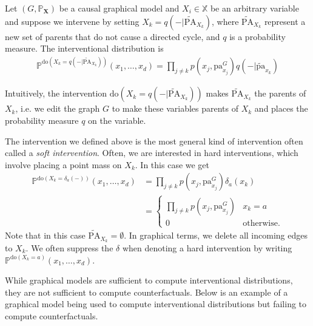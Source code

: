 \documentclass[../main.tex]{subfiles}
\begin{document}
    \begin{defn}
    \label{defn:Interventional-distributions}
        Let ${(G, \mathbb{P}_\mathbf{X})}$ be a causal graphical model and ${X_i\in \mathbb{X}}$ be an arbitrary variable and suppose we intervene by setting ${X_k = q(- | \tilde{\text{PA}}_{X_k})}$, where $\tilde{\text{PA}}_{X_k}$ represent a new set of parents that do not cause a directed cycle, and ${q}$ is a probability measure. The interventional distribution is 
        \begin{align*}
            \mathbb{P}^{\text{do}(X_k = q(- | \tilde{\text{PA}}_{X_k}))}(x_1,\dots, x_d) = \prod_{j\neq k} p(x_j, \text{pa}_{x_j}^G)q(- | \tilde{\text{pa}}_{x_k})
        \end{align*}
    \end{defn}
    Intuitively, the intervention ${\text{do}(X_k = q(- | \tilde{\text{PA}}_{X_k}))}$ makes ${\tilde{\text{PA}}_{X_k}}$ the parents of ${X_k}$, i.e. we edit the graph ${G}$ to make these variables parents of ${X_k}$ and places the probability measure ${q}$ on the variable.
    \begin{rem}
    \label{rem:Hard-Interventions}
        The intervention we defined above is the most general kind of intervention often called a \emph{soft intervention}. Often, we are interested in hard interventions, which involve placing a point mass on ${X_k}$. In this case we get 
        \begin{align*}
            \mathbb{P}^{\text{do}(X_k = \delta_a(-))}(x_1,\dots, x_d) &= \prod_{j\neq k} p(x_j, \text{pa}_{x_j}^G)\delta_a(x_k)\\
            &= \begin{cases}
                \prod_{j\neq k} p(x_j, \text{pa}_{x_j}^G) & x_k = a \\
                0 & \text{otherwise}. 
            \end{cases}
        \end{align*}
        Note that in this case ${\tilde{\text{PA}}_{X_k}=\emptyset}$. In graphical terms, we delete all incoming edges to ${X_k}$. We often suppress the ${\delta}$ when denoting a hard intervention by writing $\mathbb{P}^{\text{do}(X_k = a)}(x_1,\dots, x_d)$.
    \end{rem}
    While graphical models are sufficient to compute interventional distributions, they are not sufficient to compute counterfactuals. Below is an example of a graphical model being used to compute interventional distributions but failing to compute counterfactuals.
\end{document}

